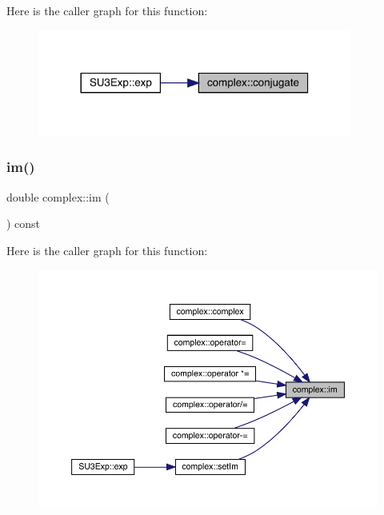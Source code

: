 Here is the caller graph for this function\+:\nopagebreak
\begin{figure}[H]
\begin{center}
\leavevmode
\includegraphics[width=293pt]{classcomplex_af21a3dae4577a3aab8e1105a1b919b81_icgraph}
\end{center}
\end{figure}
\mbox{\label{classcomplex_a450461dea92da7f72b96402edafd07c2}} 
\subsubsection{\texorpdfstring{im()}{im()}}
{\footnotesize\ttfamily double complex\+::im (\begin{DoxyParamCaption}{ }\end{DoxyParamCaption}) const\hspace{0.3cm}{\ttfamily [inline]}}

Here is the caller graph for this function\+:\nopagebreak
\begin{figure}[H]
\begin{center}
\leavevmode
\includegraphics[width=350pt]{classcomplex_a450461dea92da7f72b96402edafd07c2_icgraph}
\end{center}
\end{figure}
\mbox{\label{classcomplex_a81dd00af9a4f56a86bd242b31cb1f8a4}} 
